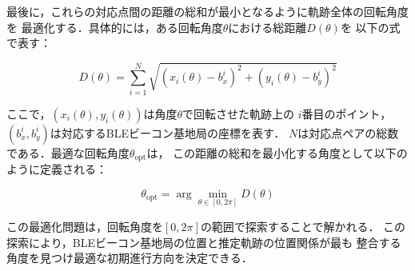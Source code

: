 最後に，これらの対応点間の距離の総和が最小となるように軌跡全体の回転角度を
最適化する．具体的には，ある回転角度$\theta$における総距離$D(\theta)$を
以下の式で表す：

\begin{equation}
D(\theta) = \sum_{i=1}^{N} \sqrt{(x_i(\theta) - b_x^i)^2 + (y_i(\theta) - b_y^i)^2}
\end{equation}

ここで，$(x_i(\theta), y_i(\theta))$は角度$\theta$で回転させた軌跡上の
$i$番目のポイント，$(b_x^i, b_y^i)$は対応するBLEビーコン基地局の座標を表す．
$N$は対応点ペアの総数である．最適な回転角度$\theta_{\mathrm{opt}}$は，
この距離の総和を最小化する角度として以下のように定義される：

\begin{equation}
\theta_{\mathrm{opt}} = \arg\min_{\theta \in [0, 2\pi]} D(\theta)
\end{equation}

この最適化問題は，回転角度を$[0, 2\pi]$の範囲で探索することで解かれる．
この探索により，BLEビーコン基地局の位置と推定軌跡の位置関係が最も
整合する角度を見つけ最適な初期進行方向を決定できる．



